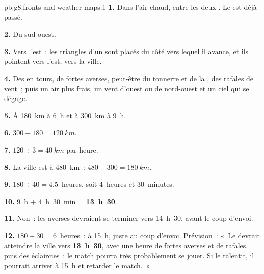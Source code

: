 \begin{solution}{pb:g8:fronts-and-weather-maps:1}
\textbf{1.} Dans l'air chaud, entre les deux . Le  est
déjà passé.

\textbf{2.} Du sud-ouest.

\textbf{3.} Vers l'est~: les triangles d'un  sont placés du côté
vers lequel il avance, et ils pointent vers l'est, vers la ville.

\textbf{4.} Des  en tours, de fortes averses, peut-être du tonnerre
et de la , des rafales de vent~; puis un air plus frais, un vent
d'ouest ou de nord-ouest et un ciel qui se dégage.

\textbf{5.} À \qty{180}{km} à 6~h et à \qty{300}{km} à 9~h.

\textbf{6.} $300 - 180 = \qty{120}{km}$.

\textbf{7.} $120 \div 3 = \qty{40}{km}$ par heure.

\textbf{8.} La ville est à \qty{480}{km}~: $480 - 300 = \qty{180}{km}$.

\textbf{9.} $180 \div 40 = 4.5$~heures, soit 4~heures et 30~minutes.

\textbf{10.} 9~h + 4~h~30~min = \textbf{13~h~30}.

\textbf{11.} Non~: les averses devraient se terminer vers 14~h~30, avant
le coup d'envoi.

\textbf{12.} $180 \div 30 = 6$~heures~: à 15~h, juste au coup d'envoi.
Prévision~: «~Le  devrait atteindre la ville vers
\textbf{13~h~30}, avec une heure de fortes averses et de rafales, puis
des éclaircies~: le match pourra très probablement se jouer. Si le 
ralentit, il pourrait arriver à 15~h et retarder le match.~»
\end{solution}
